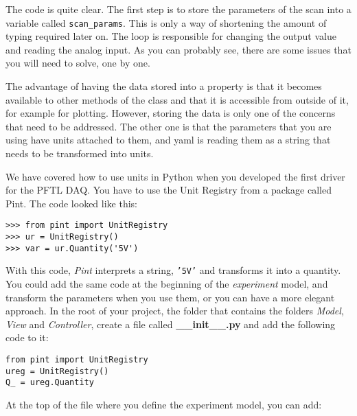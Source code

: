 The code is quite clear. The first step is to store the parameters of
the scan into a variable called \texttt{scan_params}. This is only a
way of shortening the amount of typing required later on. The loop is
responsible for changing the output value and reading the analog input.
As you can probably see, there are some issues that you will need to
solve, one by one.


The advantage of having the data stored into a property is that it
becomes available to other methods of the class and that it is
accessible from outside of it, for example for plotting. However,
storing the data is only one of the concerns that need to be addressed.
The other one is that the parameters that you are using have units
attached to them, and yaml is reading them as a string that needs to be
transformed into units.

We have covered how to use units in Python when you developed the first
driver for the {PFTL} {DAQ}. You have to use the Unit Registry from a
package called Pint. The code looked like this:

\begin{verbatim}
>>> from pint import UnitRegistry
>>> ur = UnitRegistry()
>>> var = ur.Quantity('5V')
\end{verbatim}

With this code, \emph{Pint} interprets a string,
\texttt{'5V'} and transforms it into a
quantity. You could add the same code at the beginning of the
\emph{experiment} model, and transform the parameters when you use them,
or you can have a more elegant approach. In the root of your project,
the folder that contains the folders \emph{Model}, \emph{View} and
\emph{Controller}, create a file called \textbf{\_\_init\_\_.py} and add
the following code to it:

\begin{verbatim}
from pint import UnitRegistry
ureg = UnitRegistry()
Q_ = ureg.Quantity
\end{verbatim}

At the top of the file where you define the experiment model, you
can add:

